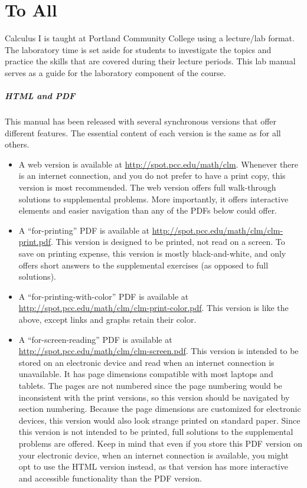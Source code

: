 \documentclass[12pt,]{book}
\theoremstyle{plain}
\theoremstyle{definition}
\theoremstyle{definition}
\theoremstyle{definition}
\theoremstyle{definition}
\theoremstyle{definition}
\numberwithin{equation}{section}
\begin{document}
\chapter*{To All}\label{to-all}
Calculus I is taught at Portland Community College using a lecture/lab format. The laboratory time is set aside for students to investigate the topics and practice the skills that are covered during their lecture periods. This lab manual serves as a guide for the laboratory component of the course.%
\typeout{************************************************}
\typeout{************************************************}
\paragraph[{HTML and PDF}]{HTML and PDF}\hypertarget{paragraphs-1}{}
This manual has been released with several synchronous versions that offer different features. The essential content of each version is the same as for all others.%
\leavevmode%
\begin{itemize}[label=\textbullet]
\item{}A web version is available at \url{http://spot.pcc.edu/math/clm}. Whenever there is an internet connection, and you do not prefer to have a print copy, this version is most recommended. The web version offers full walk-through solutions to supplemental problems. More importantly, it offers interactive elements and easier navigation than any of the PDFs below could offer.%
\item{}A ``for-printing'' PDF is available at \url{http://spot.pcc.edu/math/clm/clm-print.pdf}. This version is designed to be printed, not read on a screen. To save on printing expense, this version is mostly black-and-white, and only offers short answers to the supplemental exercises (as opposed to full solutions).%
\item{}A ``for-printing-with-color'' PDF is available at \url{http://spot.pcc.edu/math/clm/clm-print-color.pdf}. This version is like the above, except links and graphs retain their color.%
\item{}A ``for-screen-reading'' PDF is available at \url{http://spot.pcc.edu/math/clm/clm-screen.pdf}. This version is intended to be stored on an electronic device and read when an internet connection is unavailable. It has page dimensions compatible with most laptops and tablets. The pages are not numbered since the page numbering would be inconsistent with the print versions, so this version should be navigated by section numbering. Because the page dimensions are customized for electronic devices, this version would also look strange printed on standard paper. Since this version is not intended to be printed, full solutions to the supplemental problems are offered. Keep in mind that even if you store this PDF version on your electronic device, when an internet connection is available, you might opt to use the HTML version instead, as that version has more interactive and accessible functionality than the PDF version.%
\end{itemize}
\typeout{************************************************}
\typeout{************************************************}
\end{document}
